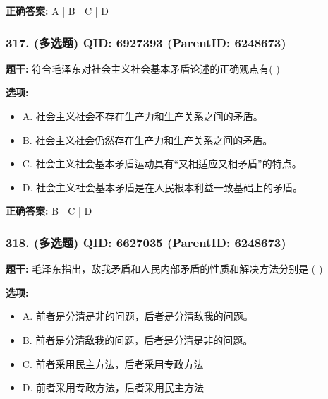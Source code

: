 \documentclass[12pt,UTF8]{ctexart}
\begin{document}
\textbf{正确答案:}
A | B | C | D

\vspace{0.3em}\hrulefill\vspace{0.7em}

\subsubsection*{317. (多选题) \small QID: 6927393 (ParentID: 6248673)}

\textbf{题干:}
符合毛泽东对社会主义社会基本矛盾论述的正确观点有(      )



\textbf{选项:}
\begin{itemize}[leftmargin=*]

  \item A. 社会主义社会不存在生产力和生产关系之间的矛盾。

  \item B. 社会主义社会仍然存在生产力和生产关系之间的矛盾。

  \item C. 社会主义社会基本矛盾运动具有“又相适应又相矛盾”的特点。

  \item D. 社会主义社会基本矛盾是在人民根本利益一致基础上的矛盾。

\end{itemize}

\textbf{正确答案:}
B | C | D

\vspace{0.3em}\hrulefill\vspace{0.7em}

\subsubsection*{318. (多选题) \small QID: 6627035 (ParentID: 6248673)}

\textbf{题干:}
毛泽东指出，敌我矛盾和人民内部矛盾的性质和解决方法分别是  ( )



\textbf{选项:}
\begin{itemize}[leftmargin=*]

  \item A. 前者是分清是非的问题，后者是分清敌我的问题。

  \item B. 前者是分清敌我的问题，后者是分清是非的问题。

  \item C. 前者采用民主方法，后者采用专政方法

  \item D. 前者采用专政方法，后者采用民主方法

\end{itemize}
\end{document}
